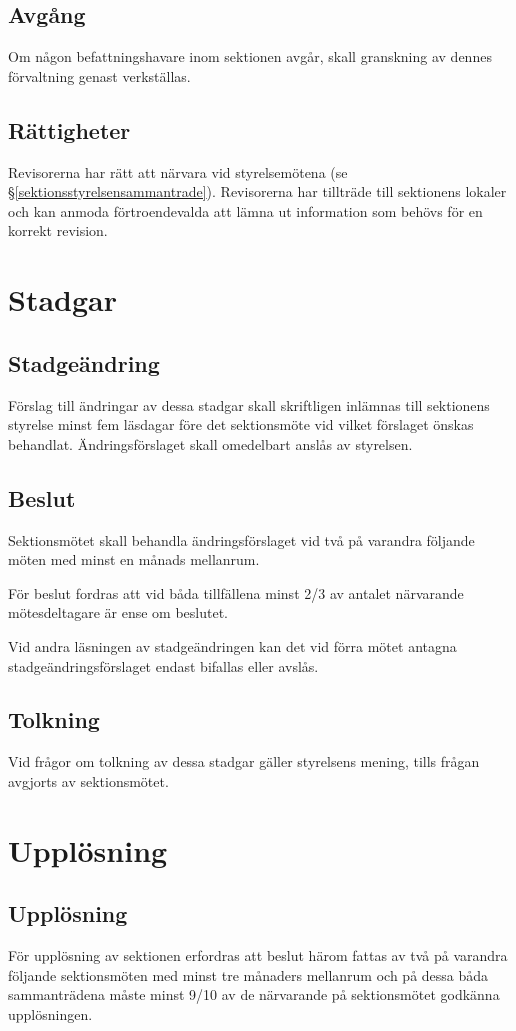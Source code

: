 \documentclass{datateknologsektionen-document}
\begin{document}
\subsection{Avgång}
Om någon befattningshavare inom sektionen avgår, skall granskning av dennes
förvaltning genast verkställas.
\subsection{Rättigheter}
Revisorerna har rätt att närvara vid styrelsemötena (se \S \ref{sektionsstyrelsensammantrade}). Revisorerna har tillträde till
sektionens lokaler och kan anmoda förtroendevalda att lämna ut information som
behövs för en korrekt revision.
\section{Stadgar}
\subsection{Stadgeändring}
Förslag till ändringar av dessa stadgar skall skriftligen inlämnas till sektionens styrelse
minst fem läsdagar före det sektionsmöte vid vilket förslaget önskas behandlat.
Ändringsförslaget skall omedelbart anslås av styrelsen.
\subsection{Beslut}
Sektionsmötet skall behandla ändringsförslaget vid två på varandra följande möten med
minst en månads mellanrum.

För beslut fordras att vid båda tillfällena minst 2/3 av antalet närvarande mötesdeltagare
är ense om beslutet.

Vid andra läsningen av stadgeändringen kan det vid förra mötet antagna
stadgeändringsförslaget endast bifallas eller avslås.
\subsection{Tolkning}
Vid frågor om tolkning av dessa stadgar gäller styrelsens mening, tills frågan avgjorts av
sektionsmötet.
\section{Upplösning}
\subsection{Upplösning}
För upplösning av sektionen erfordras att beslut härom fattas av två på varandra följande
sektionsmöten med minst tre månaders mellanrum och på dessa båda sammanträdena
måste minst 9/10 av de närvarande på sektionsmötet godkänna upplösningen.
\end{document}
